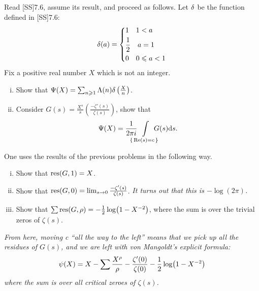 \documentclass[12pt]{memoir}
\begin{document}
\begin{Ej}
    Read [SS]7.6, assume its result, and proceed as follows. Let $\delta$ be the function defined in [SS]7.6:
    $$\dl(a)=\left\lbrace
    \begin{aligned}
        &1\quad 1<a\\
        &\half\quad a=1\\
        &0\quad 0\leq a<1\\
    \end{aligned}
    \right.$$
    Fix a positive real number $X$ which is not an integer.
    \begin{enumerate}[i)]
        \item Show that $\Psi(X)=\sum_{n\geqslant 1}\Lambda(n)\delta\left(\frac{X}{n}\right)$.
        \item Consider $G(s)=\frac{X^s}{s}\left(\frac{-\zeta'(s)}{\zeta(s)}\right)$, show that 
        $$\Psi(X)=\frac{1}{2\pi i}\hspace*{-1em}\int\limits_{\{\,\Re(s)=c\,\}}\hspace*{-1em}G(s)\dd s.$$
    \end{enumerate}
\end{Ej}

\begin{ptcbr}
\end{ptcbr}

\begin{Ej}
    One uses the results of the previous problems in the following way.
    \begin{enumerate}[i)]
        \item Show that $\operatorname*{res}(G,1)=X$. 
        \item Show that $\operatorname*{res}(G,0)=\lim_{s\to 0}\frac{-\zeta'(s)}{\zeta(s)}$. \emph{It turns out that this is $-\log(2\pi)$.}
        \item Show that $\sum\operatorname*{res}(G,\rho)=-\frac{1}{2}\log(1-X^{-2})$, where the sum is over the trivial zeros of $\zeta(s)$.
    \end{enumerate}
    \emph{From here, moving c “all the way to the left” means that we pick up all the residues of $G(s)$, and we
    are left with von Mangoldt's explicit formula:}
    $$\psi(X)=X-\sum\frac{X^\rho}{\rho}-\frac{\zeta'(0)}{\zeta(0)}-\half\log(1-X^{-2})$$
    \emph{where the sum is over all critical zeroes of $\zeta(s)$.}
\end{Ej}
\end{document}
